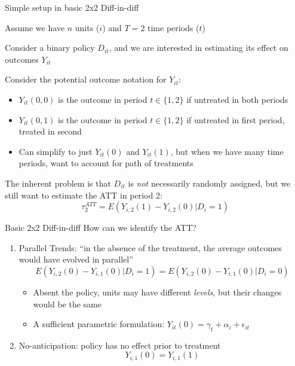 \documentclass[notes,11pt, aspectratio=169]{beamer}
\newenvironment{wideitemize}{\itemize\addtolength{\itemsep}{10pt}}{\enditemize}
\begin{document}
\begin{frame}{Simple setup in basic 2x2 Diff-in-diff }
  \begin{wideitemize}
  \item Assume we have $n$ units ($i$) and $T=2$ time periods ($t$) 
  \item Consider a binary policy $D_{it}$, and we are interested
    in estimating its effect on outcomes $Y_{it}$
  \item Consider the potential outcome notation for $Y_{it}$:
    \begin{itemize}
    \item $Y_{it}(0,0)$ is the outcome in period $t\in \{1,2\}$ if untreated in both periods
    \item $Y_{it}(0,1)$ is the outcome in period $t\in \{1,2\}$ if
      untreated in first period, treated in second
    \item Can simplify to just $Y_{it}(0)$ and $Y_{it}(1)$, but when
      we have many time periods, want to account for path of treatments
    \end{itemize}
  \item The inherent problem is that $D_{it}$ is \emph{not}
    necessarily randomly assigned, but we still want to estimate the ATT in period 2:
    \begin{equation*}
      \tau_{2}^{ATT} = E(Y_{i,2}(1) - Y_{i,2}(0) | D_{i} = 1)
    \end{equation*}
  \end{wideitemize}
\end{frame}

\begin{frame}{Basic 2x2 Diff-in-diff}
  How can we identify the ATT?
  \begin{enumerate}
  \item Parallel Trends: ``in the absence of the treatment, the average outcomes would have evolved in parallel''
    \begin{equation*}
        E(Y_{i,2}(0) - Y_{i,1}(0) | D_{i} = 1) =     E(Y_{i,2}(0) - Y_{i,1}(0) | D_{i} = 0)
      \end{equation*}
      \begin{itemize}
      \item Absent the policy, units may have different \emph{levels}, but their changes would be the same
      \item A sufficient parametric formulation: $Y_{it}(0) = \gamma_{t} + \alpha_{i} + \epsilon_{it}$
      \end{itemize}
    \item No-anticipation: policy has no effect prior to treatment
    \begin{equation*}
        Y_{i,1}(0) = Y_{i,1}(1) 
      \end{equation*}
    \end{enumerate}
\end{frame}
\end{document}
